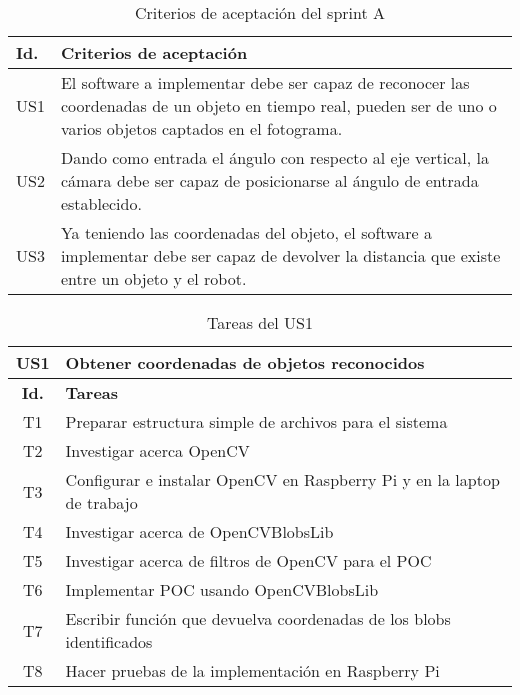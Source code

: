 \begin{table}[ht]
\centering
\begin{tabular}{|l|p{15cm}|}
\hline
\textbf{Id.} & \textbf{Criterios de aceptación}\\
\hline
US1 & El software a implementar debe ser capaz de reconocer las coordenadas de un objeto en tiempo real, pueden ser de uno o varios objetos captados en el fotograma. \\
\hline
US2 & Dando como entrada el ángulo con respecto al eje vertical, la cámara debe ser capaz de posicionarse al ángulo de entrada establecido. \\
\hline
US3 & Ya teniendo las coordenadas del objeto, el software a implementar debe ser capaz de devolver la distancia que existe entre un objeto y el robot. \\
\hline
\end{tabular}
\caption{Criterios de aceptación del sprint A}
\label{table:criteriosSA}
\end{table}


\begin{table}[ht]
\centering
\begin{tabular}{|c|p{13cm}|}
\hline
\textbf{US1} & \textbf{Obtener coordenadas de objetos reconocidos} \\
\hline
\hline
\textbf{Id.} & \textbf{Tareas}\\
\hline
T1 & Preparar estructura simple de archivos para el sistema  \\ \hline
T2 & Investigar acerca OpenCV \\ \hline
T3 & Configurar e instalar OpenCV en Raspberry Pi y en la laptop de trabajo \\ \hline
T4 & Investigar acerca de OpenCVBlobsLib \\ \hline
T5 & Investigar acerca de filtros de OpenCV para el POC \\ \hline
T6 & Implementar POC usando OpenCVBlobsLib \\ \hline
T7 & Escribir función que devuelva coordenadas de los blobs identificados \\ \hline
T8 & Hacer pruebas de la implementación en Raspberry Pi \\ \hline
\end{tabular}
\caption{Tareas del US1}
\label{table:tareasUS1}
\end{table}

